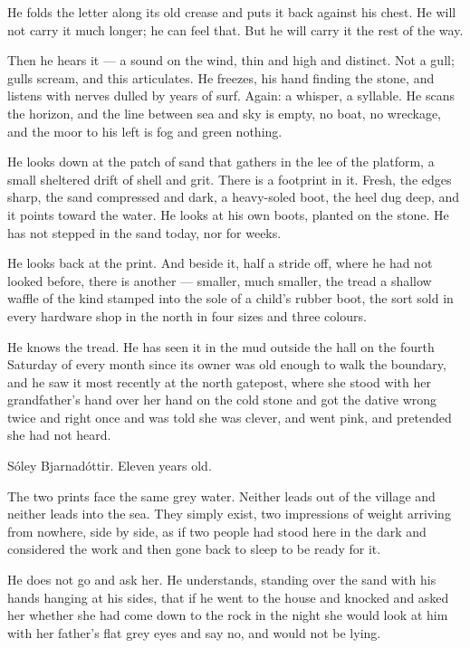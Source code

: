 \documentclass[11pt,oneside]{book}
\newcommand{\sceneline}{%
  \par\vspace{1.2em}
  \begin{center}
    \fontsize{11}{11}\selectfont \textbullet\quad\textbullet\quad\textbullet
  \end{center}
  \vspace{0.6em}\noindent\ignorespaces
}
\begin{document}
He folds the letter along its old crease and puts it back against his
chest. He will not carry it much longer; he can feel that. But he will
carry it the rest of the way.

\sceneline

Then he hears it --- a sound on the wind, thin and high and distinct.
Not a gull; gulls scream, and this articulates. He freezes, his hand
finding the stone, and listens with nerves dulled by years of surf.
Again: a whisper, a syllable. He scans the horizon, and the line between
sea and sky is empty, no boat, no wreckage, and the moor to his left is
fog and green nothing.

He looks down at the patch of sand that gathers in the lee of the
platform, a small sheltered drift of shell and grit. There is a
footprint in it. Fresh, the edges sharp, the sand compressed and dark, a
heavy-soled boot, the heel dug deep, and it points toward the water. He
looks at his own boots, planted on the stone. He has not stepped in the
sand today, nor for weeks.

He looks back at the print. And beside it, half a stride off, where he
had not looked before, there is another --- smaller, much smaller, the
tread a shallow waffle of the kind stamped into the sole of a child's
rubber boot, the sort sold in every hardware shop in the north in four
sizes and three colours.

He knows the tread. He has seen it in the mud outside the hall on the
fourth Saturday of every month since its owner was old enough to walk
the boundary, and he saw it most recently at the north gatepost, where
she stood with her grandfather's hand over her hand on the cold stone
and got the dative wrong twice and right once and was told she was
clever, and went pink, and pretended she had not heard.

Sóley Bjarnadóttir. Eleven years old.

The two prints face the same grey water. Neither leads out of the
village and neither leads into the sea. They simply exist, two
impressions of weight arriving from nowhere, side by side, as if two
people had stood here in the dark and considered the work and then gone
back to sleep to be ready for it.

He does not go and ask her. He understands, standing over the sand with
his hands hanging at his sides, that if he went to the house and knocked
and asked her whether she had come down to the rock in the night she
would look at him with her father's flat grey eyes and say no, and would
not be lying.
\end{document}
